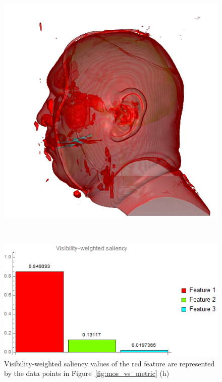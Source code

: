 \begin{figure}
\begin{minipage}{.24\textwidth}
		\includegraphics[width=1\linewidth]{images/vismale_naive_optimized_red_1000}
		\subcaption{}
	\end{minipage}~
	\begin{minipage}{.25\textwidth}
		\includegraphics[width=1\linewidth]{images/vismale_naive_optimized_red_1000_visibility_saliency_weighted_chart}
		\subcaption{}
	\end{minipage}
	\caption{Visibility-weighted saliency values of the red feature are represented by the data points in Figure~\ref{fig:mos_vs_metric} (h)}
	\label{fig:vismale_feature1_charts}
\end{figure}

